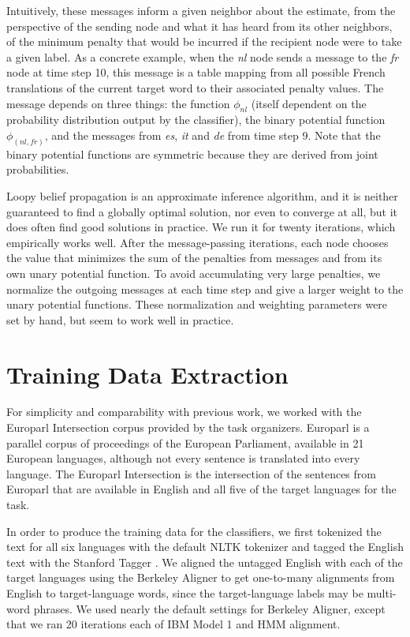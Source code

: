 \documentclass[11pt,letterpaper]{article}
\begin{document}
Intuitively, these messages inform a given neighbor about the estimate, from
the perspective of the sending node and what it has heard from its other
neighbors, of the minimum penalty that would be incurred if the recipient node
were to take a given label. As a concrete example, when the \emph{nl} node
sends a message to the \emph{fr} node at time step 10, this message is a table
mapping from all possible French translations of the current target word
to their associated penalty values. The message depends on three things: the
function $\phi_{nl}$ (itself dependent on the probability distribution output
by the classifier), the binary potential function $\phi_{(nl,fr)}$, and the
messages from \emph{es}, \emph{it} and \emph{de} from time step 9.  Note that
the binary potential functions are symmetric because they are derived from
joint probabilities.

Loopy belief propagation is an approximate inference algorithm, and it is
neither guaranteed to find a globally optimal solution, nor even to converge at
all, but it does often find good solutions in practice. We run it for twenty
iterations, which empirically works well. After the message-passing iterations,
each node chooses the value that minimizes the sum of the penalties from
messages and from its own unary potential function. To avoid accumulating very
large penalties, we normalize the outgoing messages at each time step and give
a larger weight to the unary potential functions. These normalization and
weighting parameters were set by hand, but seem to work well in practice.

\section{Training Data Extraction}
\label{extraction}
For simplicity and comparability with previous work, we worked with the
Europarl Intersection corpus provided by the task organizers. Europarl
\cite{europarl} is a parallel corpus of proceedings of the European Parliament,
available in 21 European languages, although not every sentence is translated
into every language. The Europarl Intersection is the intersection of the
sentences from Europarl that are available in English and all five of the
target languages for the task.

In order to produce the training data for the classifiers, we first tokenized
the text for all six languages with the default NLTK tokenizer and tagged the
English text with the Stanford Tagger
\cite{Toutanova03feature-richpart-of-speech}. We aligned the untagged English
with each of the target languages using the Berkeley Aligner
\cite{denero-klein:2007:ACLMain} to get one-to-many alignments from English to
target-language words, since the target-language labels may be multi-word
phrases. We used nearly the default settings for Berkeley Aligner, except that
we ran 20 iterations each of IBM Model 1 and HMM alignment.
\end{document}
